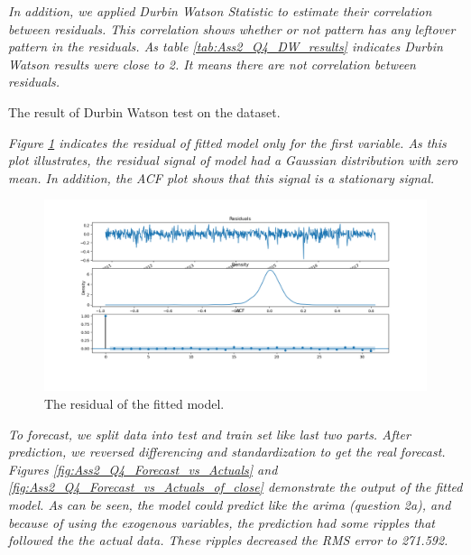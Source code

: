 \textit{In addition, we applied Durbin Watson Statistic to estimate their correlation between residuals. This correlation shows whether or not pattern has any leftover pattern in the residuals. As table \ref{tab:Ass2_Q4_DW_results} indicates Durbin Watson results were close to 2. It means there are not correlation between residuals. } 

\begin{table}[H]
\centering
\caption{The result of Durbin Watson test on the dataset.}
\label{tab:Ass2_Q4_DW_results}

\end{table}




\textit{Figure \ref{fig:Ass2_Q4_residual_plot} indicates the residual of fitted model only for the first variable. As this plot illustrates, the residual signal of model had a Gaussian distribution with zero mean. In addition, the \gls{ACF} plot shows that this signal is a stationary signal.}



\begin{figure}[H]
    \centering
    \begin{minipage}[b]{1\textwidth}
        \includegraphics[width=\textwidth]{manuscript/src/figures/Ass2/Ass2_Q4_residual_plot.png}
    \end{minipage}
    \caption{The residual of the fitted model.}
    \label{fig:Ass2_Q4_residual_plot}
\end{figure}

\textit{To forecast, we split data into test and train set like last two parts. After prediction, we reversed differencing and standardization to get the real forecast. Figures \ref{fig:Ass2_Q4_Forecast_vs_Actuals} and \ref{fig:Ass2_Q4_Forecast_vs_Actuals_of_close} demonstrate the output of the fitted model. As can be seen, the model could predict like the \gls{arima} (question 2a), and because of using the exogenous variables, the prediction had some ripples that followed the the actual data. These ripples decreased the RMS error to 271.592.} 

